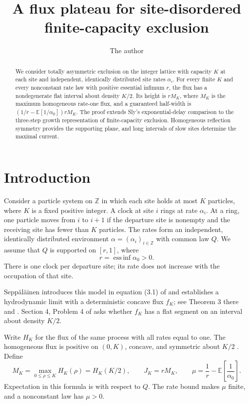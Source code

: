 \documentclass[11pt]{amsart}
\title{A flux plateau for site-disordered finite-capacity exclusion}
\author{The author}
\date{}
\theoremstyle{remark}
\newcommand{\EE}{\mathbb E}
\newcommand{\ZZ}{\mathbb Z}
\DeclareMathOperator*{\essinf}{ess\,inf}
\numberwithin{equation}{section}
\begin{document}
\begin{abstract}
We consider totally asymmetric exclusion on the integer lattice with capacity
$K$ at each site and independent, identically distributed site rates $\alpha_i$.
For every finite $K$ and every nonconstant rate law with positive essential
infimum $r$, the flux has a nondegenerate flat interval about density $K/2$.
Its height is $rM_K$, where $M_K$ is the maximum homogeneous rate-one flux,
and a guaranteed half-width is
$(1/r-\EE[1/\alpha_0])rM_K$.
The proof extends Sly's exponential-delay comparison to the three-step growth
representation of finite-capacity exclusion. Homogeneous reflection symmetry
provides the supporting plane, and long intervals of slow sites determine
the maximal current.
\end{abstract}
\maketitle

\section{Introduction}

Consider a particle system on $\ZZ$ in which each site holds at most $K$
particles, where $K$ is a fixed positive integer. A clock at site $i$ rings
at rate $\alpha_i$. At a ring, one particle moves from $i$ to $i+1$ if the
departure site is nonempty and the receiving site has fewer than $K$
particles. The rates form an independent, identically distributed
environment $\alpha=(\alpha_i)_{i\in\ZZ}$ with common law $Q$. We assume
that $Q$ is supported on $[r,1]$, where
\[
 r=\essinf\alpha_0>0.
\]
There is one clock per departure site; its rate does not increase with the
occupation of that site.

Sepp\"al\"ainen introduces this model in equation (3.1) of
\cite{SeppSurvey} and establishes a hydrodynamic limit with a deterministic
concave flux $f_K$; see Theorem 3 there and \cite{SeppHydro}.
Section 4, Problem 4 of \cite{SeppSurvey} asks whether $f_K$ has a flat
segment on an interval about density $K/2$.

Write $H_K$ for the flux of the same process with all rates equal to one.
The homogeneous flux is positive on $(0,K)$, concave, and symmetric about
$K/2$ \cite[Theorem 9.5]{SeppNotes}. Define
\begin{equation}\label{eq:constants}
 M_K=\max_{0\leq\rho\leq K}H_K(\rho)=H_K(K/2),\qquad
 J_K=rM_K,\qquad
 \mu=\frac1r-\EE\!\left[\frac1{\alpha_0}\right].
\end{equation}
Expectation in this formula is with respect to $Q$. The rate bound makes
$\mu$ finite, and a nonconstant law has $\mu>0$.
\end{document}
